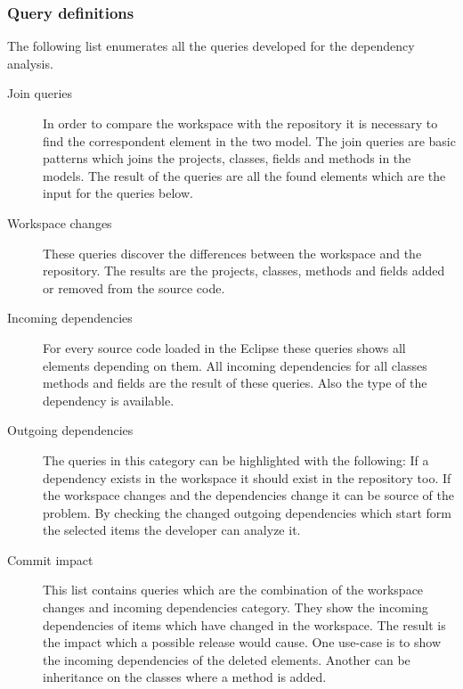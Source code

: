 \subsubsection{Query definitions}
The following list enumerates all the  queries developed for the dependency
analysis.
\begin{description}	
\item[Join queries]
In order to compare the workspace with the repository it is necessary to find 
the correspondent element in the two model. The join queries are basic patterns 
which joins the projects, classes, fields and methods in the models. The result
of the queries are all the found elements which are the input for the queries 
below. 
\item[Workspace changes] These queries discover the differences between the 
workspace and the repository. The results are the projects, classes, methods
and fields added or removed from the source code.   
\item[Incoming dependencies] For every source code loaded in the Eclipse these
queries shows all elements depending  on them. All incoming dependencies for 
all classes methods and fields are the result of these queries. Also the type
of the dependency is available. 
\item[Outgoing dependencies] The queries in this category can be highlighted 
with the following: If a dependency exists in the workspace it should
exist in the repository too. If the workspace changes and the dependencies change
it can be source of the problem.  By checking the changed outgoing dependencies
which start form the selected items the developer can analyze it.
\item[Commit impact] This list contains queries which are the combination of 
the workspace changes and incoming dependencies category. They show the incoming
dependencies of items which have changed in the workspace. The result is the
impact which a possible release would cause.  One use-case is to show the
incoming dependencies of the deleted elements. Another can be inheritance on
the classes where a method is added.
\end{description}


